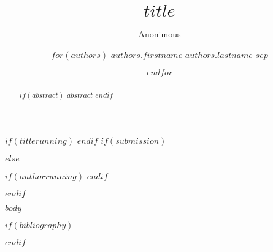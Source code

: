 \documentclass[runningheads]{llncs}
\begin{document}
%
\title{$title$}
%
$if(titlerunning)$  $endif$
%
$if(submission)$
\author{Anonimous}
$else$
\author{
$for(authors)$
$authors.firstname$ $authors.lastname$ $sep$\and
$endfor$
}
$if(authorrunning)$  $endif$

$endif$

%
\maketitle
%
\begin{abstract}
$if(abstract)$ $abstract$ $endif$ 

\end{abstract}

$body$
%
%
%
% 

% 
%

$if(bibliography)$

$endif$
\end{document}
